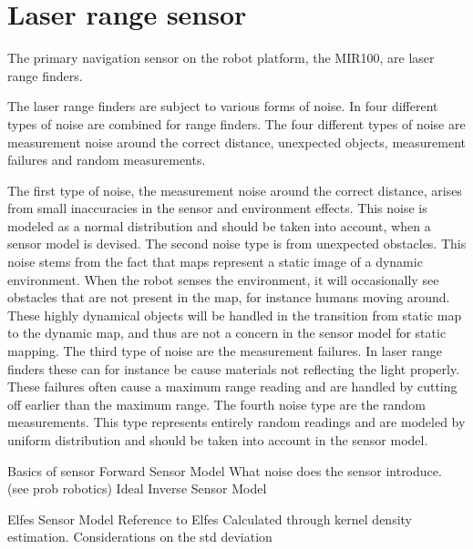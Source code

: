 \section{Laser range sensor}
The primary navigation sensor on the robot platform, the MIR100, are laser range finders. 

The laser range finders are subject to various forms of noise. In \cite{probRob} four different types of noise are combined for range finders. 
The four different types of noise are measurement noise around the correct distance, unexpected objects, measurement failures and random measurements.

The first type of noise, the measurement noise around the correct distance, arises from small inaccuracies in the sensor and environment effects. This noise is modeled as a normal distribution and should be taken into account, when a sensor model is devised. 
The second noise type is from unexpected obstacles. This noise stems from the fact that maps represent a static image of a dynamic environment. When the robot senses the environment, it will occasionally see obstacles that are not present in the map, for instance humans moving around. These highly dynamical objects will be handled in the transition from static map to the dynamic map, and thus are not a concern in the sensor model for static mapping.
The third type of noise are the measurement failures. In laser range finders these can for instance be cause materials not reflecting the light properly. These failures often cause a maximum range reading and are handled by cutting off earlier than the maximum range.
The fourth noise type are the random measurements. This type represents entirely random readings and are modeled by uniform distribution and should be taken into account in the sensor model.


Basics of sensor
Forward Sensor Model
What noise does the sensor introduce. (see prob robotics)
Ideal Inverse Sensor Model

Elfes Sensor Model
Reference to Elfes
Calculated through kernel density estimation. 
Considerations on the std deviation
